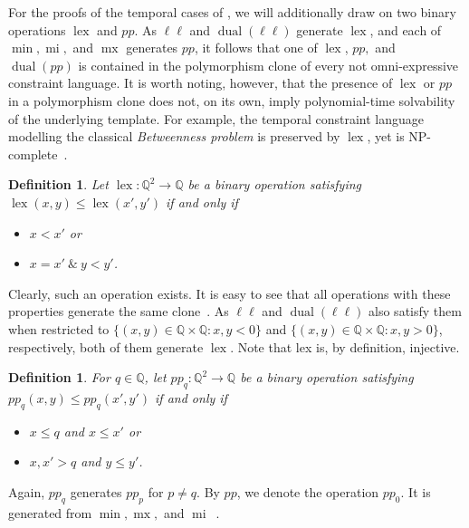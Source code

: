 \documentclass[a4paper,reqno, cleveref]{amsart}
\newtheorem{definition}[theorem]{Definition}
\newcommand{\Q}{\mathbb{Q}}
\DeclareMathOperator{\mx}{mx}
\DeclareMathOperator{\mi}{mi}
\DeclareMathOperator{\dual}{dual}
\DeclareMathOperator{\lex}{lex}
\newcommand{\pp}[1]{pp_{#1}}
\begin{document}
   

For the proofs of the temporal cases of , we will additionally draw on two binary operations $\lex$ and $pp$. As $\ell \ell$ and $\dual(\ell \ell)$ generate  $\lex$, and each of $\min, \mi,$ and $\mx$ generates $pp$, it follows that one of $\lex$, $pp,$ and $\dual(pp)$ is contained in the polymorphism clone of every not omni-expressive constraint language.  It is worth noting, however, that the presence of 
$\lex$ or $pp$ in a polymorphism clone does not, on its own, imply polynomial-time solvability of the underlying template. For example, the temporal constraint language modelling the classical \emph{Betweenness problem} is preserved by $\lex$, yet is NP-complete~\cite{Opatrny}. 

\begin{definition}
   Let $\lex:\Q^2\to \Q$ be a binary operation satisfying
    $\lex(x,y)\leq \lex(x', y')$ if and only if 
    \begin{itemize}
        \item $x < x'$ or
        \item $x= x' \ \& \ y < y'$.
    \end{itemize} 
   
\end{definition}
 

Clearly, such an operation exists. It is easy to see that all operations with these properties generate the same clone~\cite[Observation 1]{bodirsky_complexity_2010}.
As $\ell\ell$ and  $\dual (\ell \ell)$ also satisfy them when restricted to $\{(x,y)\in\Q\times\Q\colon x,y<0\}$ and $\{(x,y)\in\Q\times\Q\colon x,y>0\}$, respectively, both of them generate $\lex$. %
%
Note that lex is, by definition, injective. 
%

\begin{definition}
    For $q \in \Q$, let $\pp{q}: \Q^2 \to \Q$ be a binary operation satisfying $\pp{q}(x,y)\leq \pp{q}(x', y')$ if and only if \begin{itemize}
        \item $x \leq q$ and $x \leq x'$ or
        \item $x, x' > q$ and $y \leq y'$.
    \end{itemize}
\end{definition}

Again, $\pp{q}$ generates $pp_p$ for $p \neq q$.
By $pp$, we denote the operation $\pp{0}.$
 It is generated from $\min, \mx,$ and $\mi$~\cite[Lemma 23]{bodirsky_complexity_2010}.
\end{document}
